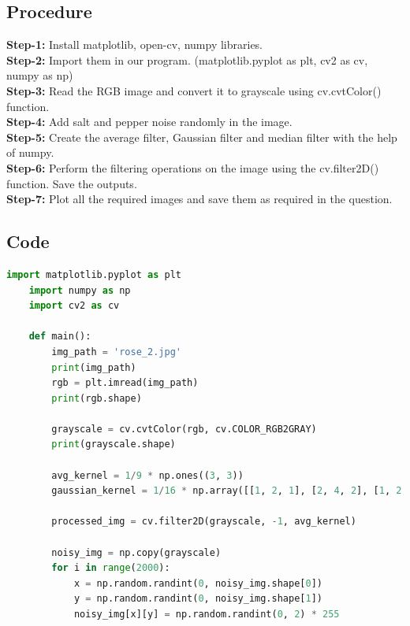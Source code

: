 \documentclass{article}
\begin{document}
{    \subsection{Procedure}
    \textbf{Step-1:}
    Install matplotlib, open-cv, numpy libraries.\\
    \textbf{Step-2:}
    Import them in our program. (matplotlib.pyplot as plt, cv2 as cv, numpy as np)\\
    \textbf{Step-3:}
    Read the RGB image and convert it to grayscale using cv.cvtColor() function.\\
    \textbf{Step-4:}
    Add salt and pepper noise randomly in the image.\\
    \textbf{Step-5:}
    Create the average filter, Gaussian filter and median filter with the help of numpy.\\
    \textbf{Step-6:}
    Perform the filtering operations on the image using the cv.filter2D() function. Save the outputs.\\
    \textbf{Step-7:}
    Plot all the required images and save them as required in the question.\\
    
    \subsection{Code}
    \lstset{style=mystyle}
    \begin{lstlisting}[language=Python, caption=Code for performing average filtering, Gaussian filtering and median filtering in a salt and pepper noisy image]
    import matplotlib.pyplot as plt
    import numpy as np
    import cv2 as cv
    
    def main():
        img_path = 'rose_2.jpg'
        print(img_path)
        rgb = plt.imread(img_path)
        print(rgb.shape)
    
        grayscale = cv.cvtColor(rgb, cv.COLOR_RGB2GRAY)
        print(grayscale.shape)
        
        avg_kernel = 1/9 * np.ones((3, 3))
        gaussian_kernel = 1/16 * np.array([[1, 2, 1], [2, 4, 2], [1, 2, 1]])
    
        processed_img = cv.filter2D(grayscale, -1, avg_kernel)
    
        noisy_img = np.copy(grayscale)
        for i in range(2000):
            x = np.random.randint(0, noisy_img.shape[0])
            y = np.random.randint(0, noisy_img.shape[1])
            noisy_img[x][y] = np.random.randint(0, 2) * 255
        

\end{lstlisting}}
\end{document}
